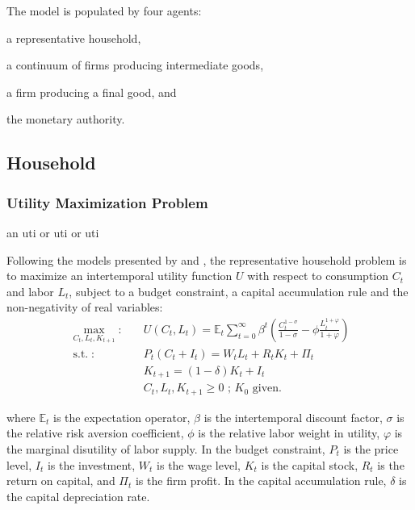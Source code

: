 \documentclass[
	12pt, 
	]{article}
\numberwithin{equation}{section}
\DeclareMathOperator{\st}{s.t.}
\newcommand{\E}[1][t]{{\mathbb{E}_{#1}}}
\theoremstyle{definition}
\theoremstyle{plain}
\theoremstyle{plain}
\theoremstyle{plain}
\begin{document}
The model is populated by four agents: 
\begin{enumerate*}[label=(\arabic*)]
	\item a representative household,
	\item a continuum of firms producing intermediate goods,
	\item a firm producing a final good, and
	\item the monetary authority.
\end{enumerate*}


\subsection{Household}

\subsubsection*{Utility Maximization Problem}

an \ac{uti} or \Ac{uti} or \acf{uti}

Following the models presented by \textcite{costa_junior_understanding_2016} and \textcite{solis-garcia_ucb_2022}, the representative household problem is to maximize an intertemporal utility function $U$ with respect to consumption $C_t$ and labor $L_t$, subject to a budget constraint, a capital accumulation rule and the non-negativity of real variables:
\begin{align}
\label{eq:household-utility-function}
	\max_{C_t,L_t,K_{t+1}}: \quad & U(C_t,L_t) = \E \sum_{t=0}^{\infty} \beta^t \left(\frac{C_t^{1-\sigma}}{1-\sigma} - \phi \frac{L_t^{1+\varphi}}{1+\varphi} \right) \\
\label{eq:household-budget-constraint}
	\st: \quad & P_t (C_t + I_t) = W_t L_t + R_t K_t + \Pi_t \\
\label{eq:law-of-motion-for-capital}
	\quad & K_{t+1} = (1-\delta)K_t + I_t \\
	\quad & C_t,L_t,K_{t+1} \geq 0 \text{ ; $K_0$ given.} \nonumber
\end{align}

where $\E$ is the expectation operator, $\beta$ is the intertemporal discount factor, $\sigma$ is the relative risk aversion coefficient, $\phi$ is the relative labor weight in utility, $\varphi$ is the marginal disutility of labor supply. In the budget constraint, $P_t$ is the price level, $I_t$ is the investment, $W_t$ is the wage level, $K_t$ is the capital stock, $R_t$ is the return on capital, and $\Pi_t$ is the firm profit. In the capital accumulation rule, $\delta$ is the capital depreciation rate.
\end{document}
